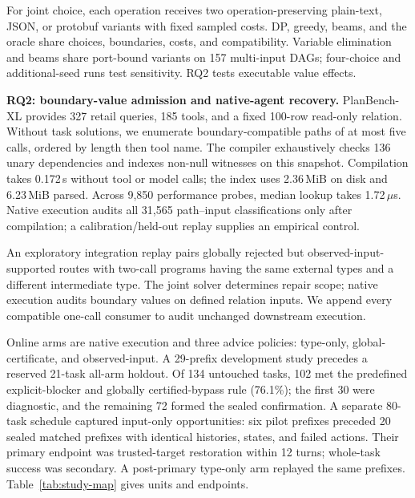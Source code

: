For joint choice, each operation receives two operation-preserving plain-text,
JSON, or protobuf variants with fixed sampled costs. DP, greedy, beams, and the oracle
share choices, boundaries, costs, and compatibility. Variable elimination and
beams share port-bound variants on 157 multi-input DAGs; four-choice and
additional-seed runs test sensitivity. RQ2 tests executable value effects.

\textbf{RQ2: boundary-value admission and native-agent recovery.}
PlanBench-XL provides 327 retail queries, 185 tools, and a fixed 100-row
read-only relation. Without task solutions, we enumerate boundary-compatible
paths of at most five calls, ordered by length then tool name. The compiler
exhaustively checks 136 unary dependencies and indexes non-null witnesses on
this snapshot. Compilation takes 0.172\,s without tool or model calls; the
index uses 2.36\,MiB on disk and 6.23\,MiB parsed. Across 9,850 performance
probes, median lookup takes 1.72\,$\mu$s. Native execution audits all 31,565
path--input classifications only after compilation; a calibration/held-out
replay supplies an empirical control.

An exploratory integration replay pairs globally rejected but
observed-input-supported routes with two-call programs having the same external types and a
different intermediate type. The joint solver determines repair scope; native
execution audits boundary values on defined relation inputs. We append every
compatible one-call consumer to audit unchanged downstream execution.


Online arms are native execution and three advice policies: type-only,
global-certificate, and observed-input. A 29-prefix development study precedes a reserved 21-task all-arm
holdout. Of 134 untouched tasks, 102 met the predefined explicit-blocker and
globally certified-bypass rule (76.1\%); the first 30 were diagnostic, and the
remaining 72 formed the sealed confirmation. A separate 80-task schedule
captured input-only opportunities: six pilot prefixes preceded 20 sealed
matched prefixes with identical histories, states, and failed actions. Their
primary endpoint was trusted-target restoration within 12 turns; whole-task
success was secondary. A post-primary type-only arm replayed the same prefixes.
Table~\ref{tab:study-map} gives units and endpoints.

